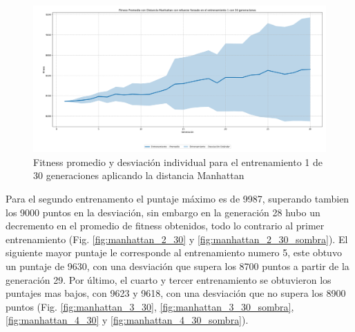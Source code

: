\documentclass[conference]{IEEEtran}
\begin{document}
\begin{figure}[H]
    \centering
    \includegraphics[width=1\linewidth]{Manhattan/Fitness_Individual_30Gen/Fitness_1_Mahn_30Gen_Sombra.png}
    \caption{Fitness promedio y desviación individual para el entrenamiento 1 de 30 generaciones aplicando la distancia Manhattan}
    \label{fig:Fitnes_ecu_1_30_inv_sombra_1-1}
\end{figure}
Para el segundo entrenamento el puntaje máximo es de 9987, superando tambien los 9000 puntos en la desviación, sin embargo en la generación 28 hubo un decremento en el promedio de fitness obtenidos, todo lo contrario al primer entrenamiento (Fig. \ref{fig:manhattan_2_30} y \ref{fig:manhattan_2_30_sombra}). El siguiente mayor puntaje le corresponde al entrenamiento numero 5, este obtuvo un puntaje de 9630, con una desviación que supera los 8700 puntos a partir de la generación 29. Por último, el cuarto y tercer entrenamiento se obtuvieron los puntajes mas bajos, con 9623 y 9618, con una desviación que no supera los 8900 puntos  (Fig. \ref{fig:manhattan_3_30}, \ref{fig:manhattan_3_30_sombra}, \ref{fig:manhattan_4_30} y \ref{fig:manhattan_4_30_sombra}).
\end{document}

